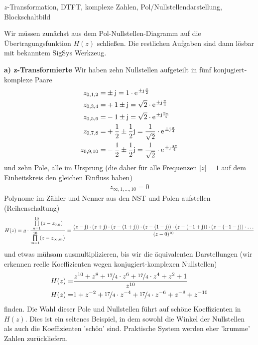\begin{Werkzeug}
$z$-Transformation, DTFT, komplexe Zahlen, Pol/Nullstellendarstellung, Blockschaltbild
\end{Werkzeug}
\begin{Ansatz}
Wir müssen zunächst aus dem
Pol-Nullstellen-Diagramm auf die Übertragungsfunktion $H(z)$ schließen. Die
restlichen Aufgaben sind dann lösbar mit bekanntem SigSys Werkzeug.
\end{Ansatz}
%
\begin{ExCalc}
%
\textbf{a) z-Transformierte}
%
Wir haben zehn Nullstellen aufgeteilt in fünf konjugiert-komplexe Paare
\begin{align}
z_{0,1,2} =& \pm \im = 1 \cdot \e^{\pm \im \frac{\pi}{2}}\\
z_{0,3,4} =& +1 \pm \im =  \sqrt{2} \cdot \e^{\pm \im \frac{\pi}{4}}\\
z_{0,5,6} =& -1 \pm \im = \sqrt{2} \cdot \e^{\pm \im \frac{3\pi}{4}}\\
z_{0,7,8} =& +\frac{1}{2} \pm \frac{1}{2}\im = \frac{1}{\sqrt{2}} \cdot \e^{\pm \im \frac{\pi}{4}}\\
z_{0,9,10} =& -\frac{1}{2} \pm \frac{1}{2}\im = \frac{1}{\sqrt{2}} \cdot \e^{\pm \im \frac{3\pi}{4}}
\end{align}
und zehn Pole, alle im Ursprung (die daher für alle Frequenzen $|z|=1$ auf dem
Einheitskreis den gleichen Einfluss haben)
\begin{align}
z_{\infty,1,...,10} = 0
\end{align}
Polynome im Zähler und Nenner aus den NST und Polen aufstellen (Reihenschaltung)
\begin{align}
H(z) = g\cdot
\frac
{\prod\limits_{n=1}^{10} (z-z_{0,n})}
{\prod\limits_{m=1}^{10} (z-z_{\infty,m})} =
\frac{
(z-\im)\cdot
(z+\im)\cdot
(z-(1 + \im))\cdot
(z-(1 - \im))\cdot
(z-(-1 + \im))\cdot
(z-(-1 - \im))\cdot
\dots
}{(z-0)^{10}}
\end{align}
und etwas mühsam ausmultiplizieren, bis wir die äquivalenten Darstellungen (wir erkennen reelle Koeffizienten wegen konjugiert-komplexen Nullstellen)
\begin{align}
H(z) =& \frac{z^{10} + z^8    + \nicefrac{17}{4}\cdot z^6     + \nicefrac{17}{4}\cdot z^4    + z^2    + 1}{z^{10}}\\
H(z) =& 1            + z^{-2} + \nicefrac{17}{4}\cdot z^{-4}  + \nicefrac{17}{4}\cdot z^{-6} + z^{-8} + z^{-10}
\end{align}
finden.
%
Die Wahl dieser Pole und Nullstellen führt auf schöne Koeffizienten in
$H(z)$. Dies ist ein seltenes Beispiel, in dem sowohl die Winkel der Nullstellen
als auch die Koeffizienten 'schön' sind.
%
Praktische System werden eher 'krumme' Zahlen zurückliefern.
%


\end{ExCalc}
